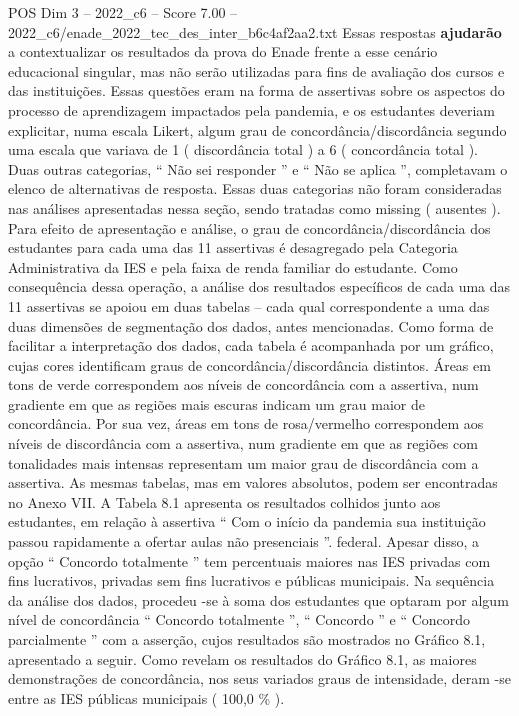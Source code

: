 \begin{textsample}{POS Dim 3 – 2022\_c6 – Score 7.00 – 2022\_c6/enade\_2022\_tec\_des\_inter\_b6c4af2aa2.txt}
Essas respostas \textbf{ajudarão} a contextualizar os resultados da prova do Enade frente a esse cenário educacional singular, mas não serão utilizadas para fins de avaliação dos cursos e das instituições.
Essas questões eram na forma de assertivas sobre os aspectos do processo de aprendizagem impactados pela pandemia, e os estudantes deveriam explicitar, numa escala Likert, algum grau de concordância/discordância segundo uma escala que variava de 1 ( discordância total ) a 6 ( concordância total ).
Duas outras categorias, “ Não sei responder ” e “ Não se aplica ”, completavam o elenco de alternativas de resposta.
Essas duas categorias não foram consideradas nas análises apresentadas nessa seção, sendo tratadas como missing ( ausentes ).
Para efeito de apresentação e análise, o grau de concordância/discordância dos estudantes para cada uma das 11 assertivas é desagregado pela Categoria Administrativa da IES e pela faixa de renda familiar do estudante.
Como consequência dessa operação, a análise dos resultados específicos de cada uma das 11 assertivas se apoiou em duas tabelas – cada qual correspondente a uma das duas dimensões de segmentação dos dados, antes mencionadas.
Como forma de facilitar a interpretação dos dados, cada tabela é acompanhada por um gráfico, cujas cores identificam graus de concordância/discordância distintos.
Áreas em tons de verde correspondem aos níveis de concordância com a assertiva, num gradiente em que as regiões mais escuras indicam um grau maior de concordância.
Por sua vez, áreas em tons de rosa/vermelho correspondem aos níveis de discordância com a assertiva, num gradiente em que as regiões com tonalidades mais intensas representam um maior grau de discordância com a assertiva.
As mesmas tabelas, mas em valores absolutos, podem ser encontradas no Anexo VII.
A Tabela 8.1 apresenta os resultados colhidos junto aos estudantes, em relação à assertiva “ Com o início da pandemia sua instituição passou rapidamente a ofertar aulas não presenciais ”. federal.
Apesar disso, a opção “ Concordo totalmente ” tem percentuais maiores nas IES privadas com fins lucrativos, privadas sem fins lucrativos e públicas municipais.
Na sequência da análise dos dados, procedeu -se à soma dos estudantes que optaram por algum nível de concordância “ Concordo totalmente ”, “ Concordo ” e “ Concordo parcialmente ” com a asserção, cujos resultados são mostrados no Gráfico 8.1, apresentado a seguir.
Como revelam os resultados do Gráfico 8.1, as maiores demonstrações de concordância, nos seus variados graus de intensidade, deram -se entre as IES públicas municipais ( 100,0 \% ).

\end{textsample}
